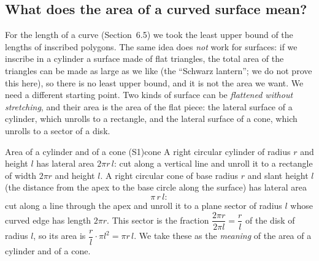 \documentclass[11pt]{article}
\begin{document}
\subsection*{What does the area of a curved surface mean?}

For the length of a curve (Section~6.5) we took the least upper bound of the lengths of inscribed polygons. The same idea does \emph{not} work for surfaces: if we inscribe in a cylinder a surface made of flat triangles, the total area of the triangles can be made as large as we like (the ``Schwarz lantern''; we do not prove this here), so there is no least upper bound, and it is not the area we want. We need a different starting point. Two kinds of surface can be \emph{flattened without stretching}, and their area is the area of the flat piece: the lateral surface of a cylinder, which unrolls to a rectangle, and the lateral surface of a cone, which unrolls to a sector of a disk.

\begin{defn}{Area of a cylinder and of a cone (S1)}{cone}
A right circular cylinder of radius $r$ and height $l$ has lateral area $2\pi r\,l$: cut along a vertical line and unroll it to a rectangle of width $2\pi r$ and height $l$. A right circular cone of base radius $r$ and slant height $l$ (the distance from the apex to the base circle along the surface) has lateral area
\[
\pi\,r\,l :
\]
cut along a line through the apex and unroll it to a plane sector of radius $l$ whose curved edge has length $2\pi r$. This sector is the fraction $\dfrac{2\pi r}{2\pi l}=\dfrac rl$ of the disk of radius $l$, so its area is $\dfrac rl\cdot\pi l^2=\pi r\,l$. We take these as the \emph{meaning} of the area of a cylinder and of a cone.
\end{defn}
\end{document}
